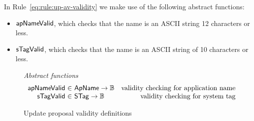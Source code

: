 In Rule~\ref{eq:rule:up-av-validity} we make use of the following abstract
functions:
\begin{itemize}
\item $\mathsf{apNameValid}$, which checks that the name is an ASCII string 12
  characters or less.
\item $\mathsf{sTagValid}$, which checks that the name is an ASCII string of 10
  characters or less.
\end{itemize}

\begin{figure}[htb]
  \emph{Abstract functions}
  \begin{equation*}
    \begin{array}{r@{~\in~}lr}
      \fun{apNameValid} & \ApName \rightarrow \mathbb{B} & \text{validity checking for application name}\\
      \fun{sTagValid} & \STag \rightarrow \mathbb{B} & \text{validity checking for system tag}
    \end{array}
  \end{equation*}
  \caption{Update proposal validity definitions}
  \label{fig:defs:update-proposal-validity}
\end{figure}


